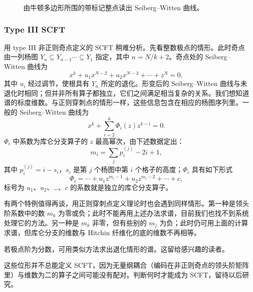 \begin{figure}[tbp]
\centering

\caption{由牛顿多边形所围的带标记整点读出 Seiberg--Witten 曲线。}
\label{fig:14}
\end{figure}

\subsubsection{Type III SCFT}
\label{sec:6.1.3}

用 type III 非正则奇点定义的 SCFT 稍难分析。先看整数极点的情形。此时奇点由一列杨图 $Y_n\subseteq Y_{n-1}\cdots\subseteq Y_1$ 指定，其中 $n=N/k+2$。奇点处的 Seiberg--Witten 曲线为
\begin{equation}
x^k+u_1x^{N-2}+u_2x^{N-3}+\cdots+z^N = 0 ,
\label{eq:6.23}\tag{6.23}
\end{equation}
其中 $u_i$ 经过调节，使根具有 $Y_n$ 所定的退化。形变后的 Seiberg--Witten 曲线与未退化时相同；但并非所有算子都独立，它们之间满足相当复杂的关系。我们想知道谱的标度维数。与正则穿刺点的情形一样，这些信息包含在相应的杨图序列里。一般的 Seiberg--Witten 曲线为
\begin{equation}
x^k+\sum_{i=2}^{k}\Phi_i(z)z^{k-i} = 0 .
\label{eq:6.24}\tag{6.24}
\end{equation}
$\Phi_i$ 中系数为库仑分支算子的 $z$ 最高幂次，由下述数据定出：
\begin{equation}
m_i = \sum_j p_i^{(j)}-2i+1 ,
\label{eq:6.25}\tag{6.25}
\end{equation}
其中 $p_i^{(j)}=i-s_i$，$s_i$ 是第 $j$ 个杨图中第 $i$ 个格子的高度；$\Phi_i$ 具有如下形式
\begin{equation}
\Phi_i = \cdots+u_1z^{m_i-1}+u_2z^{m_i-2}+\cdots+c ,
\label{eq:6.26}\tag{6.26}
\end{equation}
标号为 $u_1$、$u_2$、…、$c$ 的系数就是独立的库仑分支算子。

有两个特例值得再谈，用正则穿刺点定义理论时也会遇到同样情形。第一种是领头阶系数中的数 $m_k$ 为零或负；此时不能再用上述办法求谱，目前我们也找不到系统处理它的方法。另一种是 $m_k$ 非零，但有些别的 $m_j$ 为负；此时仍可用上面的计算求谱，但库仑分支的维数与 Hitchin 纤维化的底的维数不再相等。

若极点阶为分数，可用类似方法求出退化情形的谱。这留给感兴趣的读者。

这些位形并不总能定义 SCFT，因为无量纲耦合（编码在非正则奇点的领头阶矩阵里）与维数为二的算子之间可能没有配对。判断何时才能成为 SCFT，留待以后研究。

